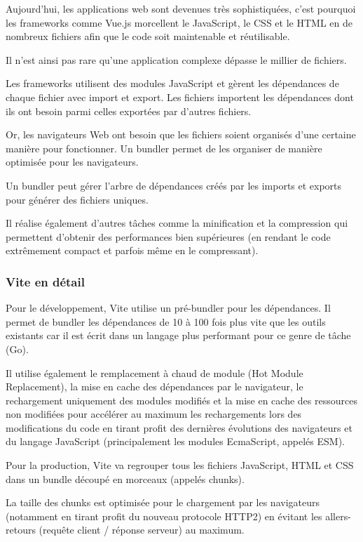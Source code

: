 \documentclass{article}
\begin{document}
Aujourd'hui, les applications web sont devenues très sophistiquées, c'est pourquoi les frameworks comme Vue.js morcellent le JavaScript, le CSS et le HTML en de nombreux fichiers afin que le code soit maintenable et réutilisable.

Il n'est ainsi pas rare qu'une application complexe dépasse le millier de fichiers.

Les frameworks utilisent des modules JavaScript et gèrent les dépendances de chaque fichier avec import et export. Les fichiers importent les dépendances dont ils ont besoin parmi celles exportées par d'autres fichiers.

Or, les navigateurs Web ont besoin que les fichiers soient organisés d'une certaine manière pour fonctionner. Un bundler permet de les organiser de manière optimisée pour les navigateurs.

Un bundler peut gérer l'arbre de dépendances créés par les imports et exports pour générer des fichiers uniques.

Il réalise également d'autres tâches comme la minification et la compression qui permettent d'obtenir des performances bien supérieures (en rendant le code extrêmement compact et parfois même en le compressant).

\subsubsection{Vite en détail}
Pour le développement, Vite utilise un pré-bundler pour les dépendances. Il permet de bundler les dépendances de 10 à 100 fois plus vite que les outils existants car il est écrit dans un langage plus performant pour ce genre de tâche (Go).

Il utilise également le remplacement à chaud de module (Hot Module Replacement), la mise en cache des dépendances par le navigateur, le rechargement uniquement des modules modifiés et la mise en cache des ressources non modifiées pour accélérer au maximum les rechargements lors des modifications du code en tirant profit des dernières évolutions des navigateurs et du langage JavaScript (principalement les modules EcmaScript, appelés ESM).

Pour la production, Vite va regrouper tous les fichiers JavaScript, HTML et CSS dans un bundle découpé en morceaux (appelés chunks).

La taille des chunks est optimisée pour le chargement par les navigateurs (notamment en tirant profit du nouveau protocole HTTP2) en évitant les allers-retours (requête client / réponse serveur) au maximum.
\end{document}
